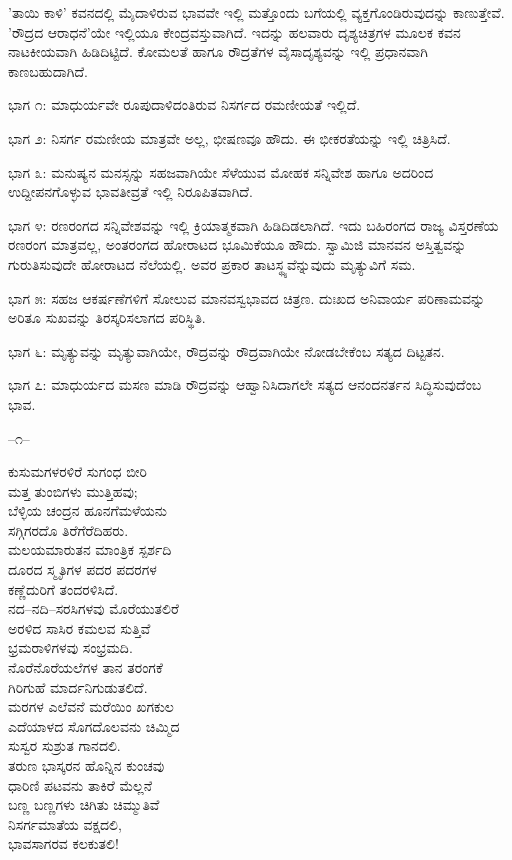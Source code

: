 'ತಾಯಿ ಕಾಳಿ' ಕವನದಲ್ಲಿ ಮೈದಾಳಿರುವ ಭಾವವೇ ಇಲ್ಲಿ ಮತ್ತೊಂದು ಬಗೆಯಲ್ಲಿ ವ್ಯಕ್ತಗೊಂಡಿರುವುದನ್ನು ಕಾಣುತ್ತೇವೆ. 'ರೌದ್ರದ ಆರಾಧನೆ'ಯೇ ಇಲ್ಲಿಯೂ ಕೇಂದ್ರವಸ್ತುವಾಗಿದೆ. ಇದನ್ನು ಹಲವಾರು ದೃಶ್ಯಚಿತ್ರಗಳ ಮೂಲಕ ಕವನ ನಾಟಕೀಯವಾಗಿ ಹಿಡಿದಿಟ್ಟಿದೆ. ಕೋಮಲತೆ ಹಾಗೂ ರೌದ್ರತೆಗಳ ವೈಸಾದೃಶ್ಯವನ್ನು ಇಲ್ಲಿ ಪ್ರಧಾನವಾಗಿ ಕಾಣಬಹುದಾಗಿದೆ.

ಭಾಗ ೧: ಮಾಧುರ್ಯವೇ ರೂಪುದಾಳಿದಂತಿರುವ ನಿಸರ್ಗದ ರಮಣೀಯತೆ ಇಲ್ಲಿದೆ.

ಭಾಗ ೨: ನಿಸರ್ಗ ರಮಣೀಯ ಮಾತ್ರವೇ ಅಲ್ಲ, ಭೀಷಣವೂ ಹೌದು. ಈ ಭೀಕರತೆಯನ್ನು ಇಲ್ಲಿ ಚಿತ್ರಿಸಿದೆ.

ಭಾಗ ೩: ಮನುಷ್ಯನ ಮನಸ್ಸನ್ನು ಸಹಜವಾಗಿಯೇ ಸೆಳೆಯುವ ಮೋಹಕ ಸನ್ನಿವೇಶ ಹಾಗೂ ಅದರಿಂದ ಉದ್ದೀಪನಗೊಳ್ಳುವ ಭಾವತೀವ್ರತೆ ಇಲ್ಲಿ ನಿರೂಪಿತವಾಗಿದೆ.

ಭಾಗ ೪: ರಣರಂಗದ ಸನ್ನಿವೇಶವನ್ನು ಇಲ್ಲಿ ಕ್ರಿಯಾತ್ಮಕವಾಗಿ ಹಿಡಿದಿಡಲಾಗಿದೆ. ಇದು ಬಹಿರಂಗದ ರಾಜ್ಯ ವಿಸ್ತರಣೆಯ ರಣರಂಗ ಮಾತ್ರವಲ್ಲ, ಅಂತರಂಗದ ಹೋರಾಟದ ಭೂಮಿಕೆಯೂ ಹೌದು. ಸ್ವಾಮಿಜಿ ಮಾನವನ ಅಸ್ತಿತ್ವವನ್ನು ಗುರುತಿಸುವುದೇ ಹೋರಾಟದ ನೆಲೆಯಲ್ಲಿ. ಅವರ ಪ್ರಕಾರ ತಾಟಸ್ಥ್ಯವೆನ್ನುವುದು ಮೃತ್ಯುವಿಗೆ ಸಮ.

ಭಾಗ ೫: ಸಹಜ ಆಕರ್ಷಣೆಗಳಿಗೆ ಸೋಲುವ ಮಾನವಸ್ವಭಾವದ ಚಿತ್ರಣ. ದುಃಖದ ಅನಿವಾರ್ಯ ಪರಿಣಾಮವನ್ನು ಅರಿತೂ ಸುಖವನ್ನು ತಿರಸ್ಕರಿಸಲಾಗದ ಪರಿಸ್ಥಿತಿ.

ಭಾಗ ೬: ಮೃತ್ಯುವನ್ನು ಮೃತ್ಯುವಾಗಿಯೇ, ರೌದ್ರವನ್ನು ರೌದ್ರವಾಗಿಯೇ ನೋಡಬೇಕೆಂಬ ಸತ್ಯದ ದಿಟ್ಟತನ.

ಭಾಗ ೭: ಮಾಧುರ್ಯದ ಮಸಣ ಮಾಡಿ ರೌದ್ರವನ್ನು ಆಹ್ವಾನಿಸಿದಾಗಲೇ ಸತ್ಯದ ಆನಂದನರ್ತನ ಸಿದ್ಧಿಸುವುದೆಂಬ ಭಾವ.

\begin{center}
–೧–
\end{center}

ಕುಸುಮಗಳರಳಿರೆ ಸುಗಂಧ ಬೀರಿ\\ಮತ್ತ ತುಂಬಿಗಳು ಮುತ್ತಿಹವು;\\ಬೆಳ್ಳಿಯ ಚಂದ್ರನ ಹೂನಗೆಮಳೆಯನು\\ಸಗ್ಗಿಗರದೊ ತಿರೆಗೆರೆದಿಹರು.\\ಮಲಯಮಾರುತನ ಮಾಂತ್ರಿಕ ಸ್ಪರ್ಶದಿ\\ದೂರದ ಸ್ಮೃತಿಗಳ ಪದರ ಪದರಗಳ\\ಕಣ್ಣೆದುರಿಗೆ ತಂದರಳಿಸಿದೆ.\\ನದ–ನದಿ–ಸರಸಿಗಳವು ಮೊರೆಯುತಲಿರೆ\\ಅರಳಿದ ಸಾಸಿರ ಕಮಲವ ಸುತ್ತಿವೆ\\ಭ್ರಮರಾಳಿಗಳವು ಸಂಭ್ರಮದಿ.\\ನೊರೆನೊರೆಯಲೆಗಳ ತಾನ ತರಂಗಕೆ\\ಗಿರಿಗುಹೆ ಮಾರ್ದನಿಗುಡುತಲಿದೆ.\\ಮರಗಳ ಎಲೆವನೆ ಮರೆಯಿಂ ಖಗಕುಲ\\ಎದೆಯಾಳದ ಸೊಗದೊಲವನು ಚಿಮ್ಮಿದ\\ಸುಸ್ವರ ಸುಶ್ರುತ ಗಾನದಲಿ.\\ತರುಣ ಭಾಸ್ಕರನ ಹೊನ್ನಿನ ಕುಂಚವು\\ಧಾರಿಣಿ ಪಟವನು ತಾಕಿರೆ ಮೆಲ್ಲನೆ\\ಬಣ್ಣ ಬಣ್ಣಗಳು ಚಿಗಿತು ಚಿಮ್ಮುತಿವೆ\\ನಿಸರ್ಗಮಾತೆಯ ವಕ್ಷದಲಿ,\\ಭಾವಸಾಗರವ ಕಲಕುತಲಿ!

